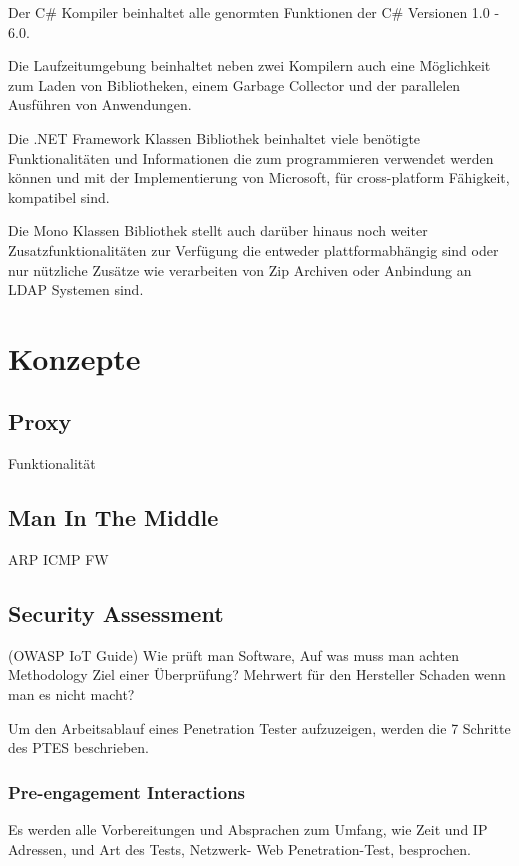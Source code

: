     Der C\# Kompiler beinhaltet alle genormten Funktionen der C\# Versionen 1.0 - 6.0.
    
    Die Laufzeitumgebung beinhaltet neben zwei Kompilern auch eine Möglichkeit zum Laden von Bibliotheken, einem Garbage Collector und der parallelen Ausführen von Anwendungen.

    Die .NET Framework Klassen Bibliothek beinhaltet viele benötigte Funktionalitäten und Informationen die zum programmieren verwendet werden können und mit der Implementierung von Microsoft, für cross-platform Fähigkeit, kompatibel sind.

    Die Mono Klassen Bibliothek stellt auch darüber hinaus noch weiter Zusatzfunktionalitäten zur Verfügung die entweder plattformabhängig sind oder nur nützliche Zusätze wie verarbeiten von Zip Archiven oder Anbindung an LDAP Systemen sind.

\section{Konzepte}
    \subsection{Proxy}
        Funktionalität
    \subsection{Man In The Middle}
    ARP
    ICMP
    FW
    \subsection{Security Assessment}
        (OWASP IoT Guide) 
        Wie prüft man Software, Auf was muss man achten Methodology %
        Ziel einer Überprüfung?
        Mehrwert für den Hersteller
        Schaden wenn man es nicht macht?
        
        Um den Arbeitsablauf eines Penetration Tester aufzuzeigen, werden die 7 Schritte des \ac{PTES} \cite{hsiangchih_2019}
    beschrieben.
    \subsubsection{\glqq Pre-engagement Interactions\grqq{}}
        Es werden alle Vorbereitungen und Absprachen zum Umfang, wie Zeit und IP Adressen, und Art des Tests, Netzwerk- Web Penetration-Test, besprochen.
        
